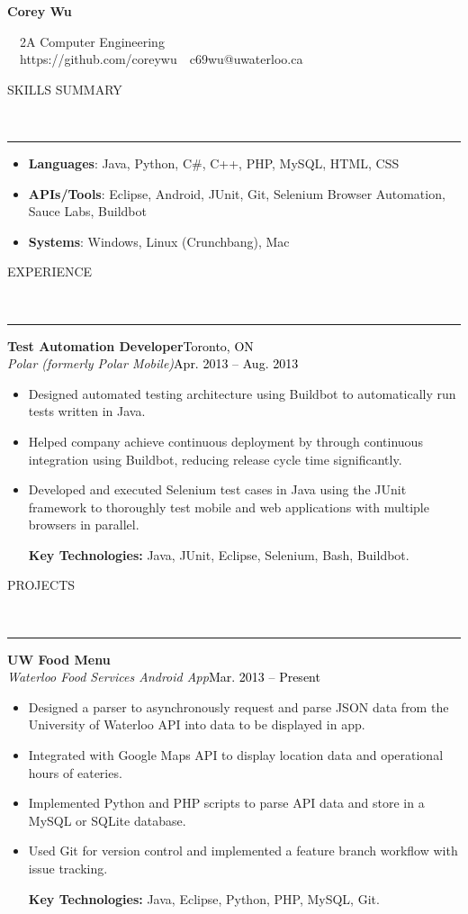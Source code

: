 \documentclass[11pt, letterpaper, oneside]{article}
\makeatletter
\newcommand{\name}{Corey Wu}
\newcommand{\program}{2A Computer Engineering}
\newcommand{\github}{https://github.com/coreywu}
\newcommand{\email}{c69wu@uwaterloo.ca}
\newcommand{\HRule}[2]{\textcolor{#1}{\rule{\linewidth}{#2}}}
\newcommand{\sectiontitle}[1]{\begin{minipage}{\textwidth}\vspace{-7.5pt}\begin{flushleft}\hspace{-20.5pt}\vspace{-25pt}
\Large\MakeUppercase{#1}\end{flushleft}\end{minipage}\\\HRule{black}{0.15mm}\vspace{\baselineskip}}
\newenvironment{ressection}[1]{
  \vspace{7pt}
  \sectiontitle{#1}}
  {\vspace{-\baselineskip}}
\newcommand{\resentryheader}[4]{
    \vspace{-5pt}
    \textbf{#1}\hspace{\stretch{1}}\textcolor{black}{#3}\\
    \textit{#2}\hspace{\stretch{1}}\textcolor{black}{#4}\\
}
\newcommand{\resitem}[1]{
    \vspace{2pt}
    \item \begin{flushleft} #1 \end{flushleft}
}
\newcommand{\resskillsitem}[2]{
	\vspace{-12pt}
    \item \begin{flushleft} \textbf{#1}: #2 \end{flushleft}
    \vspace{4pt}
}
\newenvironment{resentry}[4]{
  \begin{minipage}{\textwidth}
    \resentryheader{#1}{#2}{#3}{#4}
        \vspace{-\baselineskip}
    \begin{itemize}[noitemsep,nolistsep]
}{
    \end{itemize}
        \vspace{\baselineskip}
        \end{minipage}
}
\makeatother
\begin{document}
\begin{center}
{\Huge \textbf{\name}}

\ \ {\Large{\program}} \\
\ \ \github \ \textbullet \ \email \ \
\end{center}

\vspace{-10pt}

\begin{ressection}{Skills Summary}
\begin{itemize}
\vspace{-8pt}
\resskillsitem{Languages}{Java, Python, C\#, C++, PHP, MySQL, HTML, CSS}
\resskillsitem{APIs/Tools}{Eclipse, Android, JUnit, Git, Selenium Browser Automation, Sauce Labs, Buildbot}
\resskillsitem{Systems}{Windows, Linux (Crunchbang), Mac}
\end{itemize}
\end{ressection}

\begin{ressection}{Experience}
  \begin{resentry}{Test Automation Developer}{Polar (formerly Polar Mobile)}{Toronto, ON}{Apr. 2013 -- Aug. 2013}
    \resitem{Designed automated testing architecture using Buildbot to automatically run tests written in Java.}
    \resitem{Helped company achieve continuous deployment by through continuous integration using Buildbot, reducing release cycle time significantly.}
    \resitem{Developed and executed Selenium test cases in Java using the JUnit framework to thoroughly test mobile and web applications with multiple browsers in parallel.}
    \vspace{4pt} \hspace{-15pt}
    \textbf{Key Technologies:} Java, JUnit, Eclipse, Selenium, Bash, Buildbot.
  \end{resentry}
\end{ressection}

\begin{ressection}{Projects}
  \begin{resentry}{UW Food Menu}{Waterloo Food Services Android App}{}{Mar. 2013 -- Present}
    \resitem{Designed a parser to asynchronously request and parse JSON data from the University of Waterloo API into data to be displayed in app.}
    \resitem{Integrated with Google Maps API to display location data and operational hours of eateries.}
    \resitem{Implemented Python and PHP scripts to parse API data and store in a MySQL or SQLite database.}
    \resitem{Used Git for version control and implemented a feature branch workflow with issue tracking.}
    \vspace{4pt} \hspace{-15pt}
    \textbf{Key Technologies:} Java, Eclipse, Python, PHP, MySQL, Git.
  \end{resentry}
\end{ressection}
\end{document}
